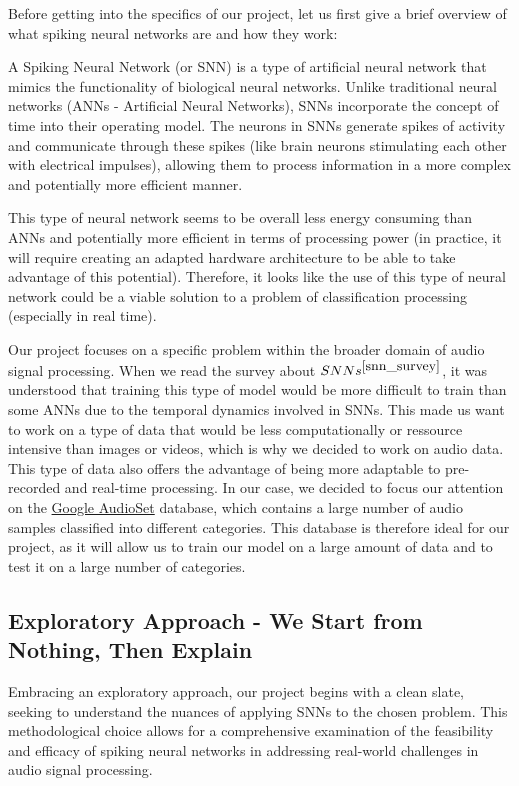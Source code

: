 \documentclass[11pt]{article}
\begin{document}
Before getting into the specifics of our project, let us first give a brief overview of what spiking neural networks are and how they work:

A Spiking Neural Network (or SNN) is a type of artificial neural network that mimics the functionality of biological neural networks. Unlike traditional neural networks (ANNs - Artificial Neural Networks), SNNs incorporate the concept of time into their operating model. The neurons in SNNs generate spikes of activity and communicate through these spikes (like brain neurons stimulating each other with electrical impulses), allowing them to process information in a more complex and potentially more efficient manner.

This type of neural network seems to be overall less energy consuming than ANNs and potentially more efficient in terms of processing power (in practice, it will require creating an adapted hardware architecture to be able to take advantage of this potential). Therefore, it looks like the use of this type of neural network could be a viable solution to a problem of classification processing (especially in real time).


Our project focuses on a specific problem within the broader domain of audio signal processing.
When we read the survey about $SNNs^{\cite{snn_survey}}$, it was understood that training this type of model would be more difficult to train than some ANNs due to the temporal dynamics involved in SNNs. This made us want to work on a type of data that would be less computationally or ressource intensive than images or videos, which is why we decided to work on audio data. This type of data also offers the advantage of being more adaptable to pre-recorded and real-time processing.
In our case, we decided to focus our attention on the \hyperref[item:google-audioset]{Google AudioSet} database, which contains a large number of audio samples classified into different categories. This database is therefore ideal for our project, as it will allow us to train our model on a large amount of data and to test it on a large number of categories.

\subsection{Exploratory Approach - We Start from Nothing, Then Explain}

Embracing an exploratory approach, our project begins with a clean slate, seeking to understand the nuances of applying SNNs to the chosen problem. This methodological choice allows for a comprehensive examination of the feasibility and efficacy of spiking neural networks in addressing real-world challenges in audio signal processing.
\end{document}
